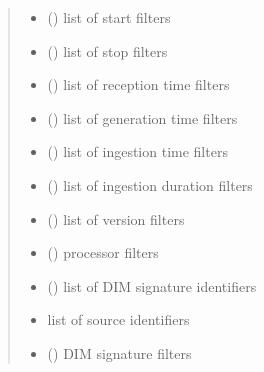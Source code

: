 \begin{fulllineitems}
\begin{fulllineitems}
\begin{quote}
\begin{description}
\begin{itemize}
\item {} 
 () \textendash{} list of start filters

\item {} 
 () \textendash{} list of stop filters

\item {} 
 () \textendash{} list of reception time filters

\item {} 
 () \textendash{} list of generation time filters

\item {} 
 () \textendash{} list of ingestion time filters

\item {} 
 () \textendash{} list of ingestion duration filters

\item {} 
 () \textendash{} list of version filters

\item {} 
 () \textendash{} processor filters

\item {} 
 () \textendash{} list of DIM signature identifiers

\item {} 
 \textendash{} list of source identifiers

\item {} 
 () \textendash{} DIM signature filters


\end{itemize}
\end{description}
\end{quote}
\end{fulllineitems}
\end{fulllineitems}
